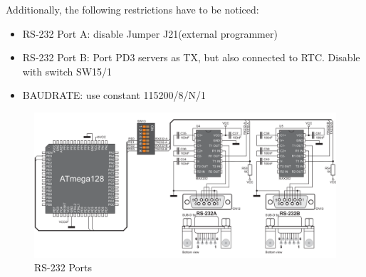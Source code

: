 Additionally, the following restrictions have to be noticed:

\begin{itemize}
 \item RS-232 Port A: disable Jumper J21(external programmer)
 \item RS-232 Port B: Port PD3 servers as TX, but also connected to RTC. Disable with switch SW15/1
 \item BAUDRATE: use constant 115200/8/N/1
\end{itemize}

\begin{figure}[h]
 \centerline{\includegraphics[width=1.0\columnwidth]{pics/UART.png}}
  \caption{RS-232 Ports}
  \label{fig:uart}
\end{figure}

